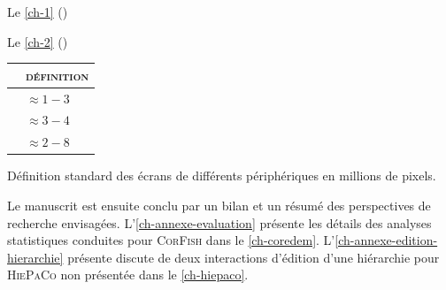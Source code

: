 Le \cref{ch-1} () \lipsum[1]

Le \cref{ch-2} () \lipsum[1]

\begin{margintable}
	\footnotesize
	\setlength\tabcolsep{.8pt} %
	\begin{tabularx}{.95\marginparwidth}{Xl}
		\toprule
		& \textsc{définition} \\
		\midrule
		{\faMobile*} & $ \approx 1-3$  \\
		{\faTablet*} & $ \approx 3-4$  \\
		{\faTv}   & $ \approx 2-8$ \\
		
		\bottomrule
	\end{tabularx}
	\caption{Définition standard des écrans de différents périphériques en millions de pixels.}
	\label{tab-ecrans}
\end{margintable}

Le manuscrit est ensuite conclu par un bilan et un résumé des perspectives de recherche envisagées. L'\cref{ch-annexe-evaluation} présente les détails des analyses statistiques conduites pour \textsc{CorFish} dans le \cref{ch-coredem}. L'\cref{ch-annexe-edition-hierarchie} présente discute de deux interactions d'édition d'une hiérarchie pour \textsc{HiePaCo} non présentée dans le \cref{ch-hiepaco}.
